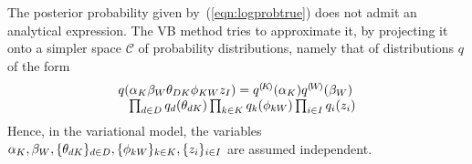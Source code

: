 \label{sec:LDAwithPrior}
The posterior probability given by~(\ref{eqn:logprobtrue}) does not admit an analytical expression. The VB method tries to approximate it, by projecting it onto a simpler space $\mathcal{C}$ of probability distributions, namely that of distributions $q$ of the form
\begin{equation}
\label{eqn:probvar}
\begin{array}{l}
q(\alpha_K\beta_W\theta_{DK}\phi_{KW}z_I) = {q}^{(\!{K}\!)}(\alpha_K){q}^{(\!{W}\!)}(\beta_W)\\
\;\;\;\prod_{d\in D}q_d(\theta_{dK})\prod_{k\in K}q_k(\phi_{kW})
\prod_{i\in I}q_i(z_i)
\end{array}
\end{equation}
Hence, in the variational model, the variables $\alpha_K,\beta_W,\{\theta_{dK}\}_{d\in D},\{\phi_{kW}\}_{k\in K},\{z_i\}_{i\in I}$ are assumed independent.
